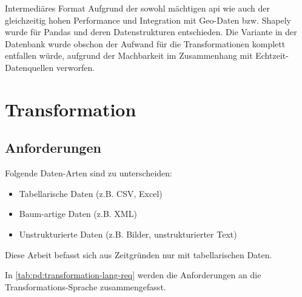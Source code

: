 \begin{decision}[label=dec:pd:format]{Intermediäres Format}
Aufgrund der sowohl mächtigen \acs{api} wie auch der gleichzeitig hohen Performance und Integration mit Geo-Daten bzw. Shapely wurde für Pandas und deren Datenstrukturen entschieden. Die Variante in der Datenbank wurde obschon der Aufwand für die Transformationen komplett entfallen würde, aufgrund der Machbarkeit im Zusammenhang mit Echtzeit-Datenquellen verworfen.
\end{decision}

\section{Transformation}

\subsection{Anforderungen}

Folgende Daten-Arten sind zu unterscheiden:
\begin{itemize}
\item Tabellarische Daten (z.B. CSV, Excel)
\item Baum-artige Daten (z.B. XML)
\item Unstrukturierte Daten (z.B. Bilder, unstrukturierter Text)
\end{itemize}

Diese Arbeit befasst sich aus Zeitgründen nur mit tabellarischen Daten.

In \cref{tab:pd:transformation-lang-req} werden die Anforderungen an die Transformations-Sprache zusammengefasst.


